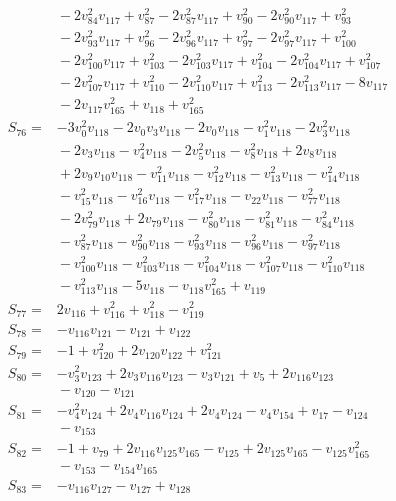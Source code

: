 \begin{align*}
&{}-2v_{84}^{2}v_{117}+v_{87}^{2}-2v_{87}^{2}v_{117}+v_{90}^{2}-2v_{90}^{2}v_{117}+v_{93}^{2}\\
&{}-2v_{93}^{2}v_{117}+v_{96}^{2}-2v_{96}^{2}v_{117}+v_{97}^{2}-2v_{97}^{2}v_{117}+v_{100}^{2}\\
&{}-2v_{100}^{2}v_{117}+v_{103}^{2}-2v_{103}^{2}v_{117}+v_{104}^{2}-2v_{104}^{2}v_{117}+v_{107}^{2}\\
&{}-2v_{107}^{2}v_{117}+v_{110}^{2}-2v_{110}^{2}v_{117}+v_{113}^{2}-2v_{113}^{2}v_{117}-8v_{117}\\
&{}-2v_{117}v_{165}^{2}+v_{118}+v_{165}^{2}\\
S_{76}={}&-3v_{0}^{2}v_{118}-2v_{0}v_{3}v_{118}-2v_{0}v_{118}-v_{1}^{2}v_{118}-2v_{3}^{2}v_{118}\\
&{}-2v_{3}v_{118}-v_{4}^{2}v_{118}-2v_{5}^{2}v_{118}-v_{8}^{2}v_{118}+2v_{8}v_{118}\\
&{}+2v_{9}v_{10}v_{118}-v_{11}^{2}v_{118}-v_{12}^{2}v_{118}-v_{13}^{2}v_{118}-v_{14}^{2}v_{118}\\
&{}-v_{15}^{2}v_{118}-v_{16}^{2}v_{118}-v_{17}^{2}v_{118}-v_{22}v_{118}-v_{77}^{2}v_{118}\\
&{}-2v_{79}^{2}v_{118}+2v_{79}v_{118}-v_{80}^{2}v_{118}-v_{81}^{2}v_{118}-v_{84}^{2}v_{118}\\
&{}-v_{87}^{2}v_{118}-v_{90}^{2}v_{118}-v_{93}^{2}v_{118}-v_{96}^{2}v_{118}-v_{97}^{2}v_{118}\\
&{}-v_{100}^{2}v_{118}-v_{103}^{2}v_{118}-v_{104}^{2}v_{118}-v_{107}^{2}v_{118}-v_{110}^{2}v_{118}\\
&{}-v_{113}^{2}v_{118}-5v_{118}-v_{118}v_{165}^{2}+v_{119}\\
S_{77}={}&2v_{116}+v_{116}^{2}+v_{118}^{2}-v_{119}^{2}\\
S_{78}={}&-v_{116}v_{121}-v_{121}+v_{122}\\
S_{79}={}&-1+v_{120}^{2}+2v_{120}v_{122}+v_{121}^{2}\\
S_{80}={}&-v_{3}^{2}v_{123}+2v_{3}v_{116}v_{123}-v_{3}v_{121}+v_{5}+2v_{116}v_{123}\\
&{}-v_{120}-v_{121}\\
S_{81}={}&-v_{4}^{2}v_{124}+2v_{4}v_{116}v_{124}+2v_{4}v_{124}-v_{4}v_{154}+v_{17}-v_{124}\\
&{}-v_{153}\\
S_{82}={}&-1+v_{79}+2v_{116}v_{125}v_{165}-v_{125}+2v_{125}v_{165}-v_{125}v_{165}^{2}\\
&{}-v_{153}-v_{154}v_{165}\\
S_{83}={}&-v_{116}v_{127}-v_{127}+v_{128}\\

\end{align*}

